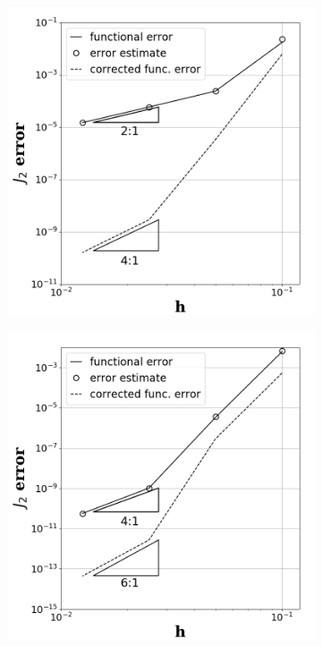 \documentclass[a4paper]{article}
\begin{document}
\begin{figure}[!htbp]
  \centering
  \centering
  \begin{subfigure}{0.45\textwidth}
    \centering
    \includegraphics[width=1.0\linewidth]{figures/subsonic_p1_J2.png}
    \label{fig:subsonic_p1_j2}
  \end{subfigure}
  \begin{subfigure}{0.45\textwidth}
    \centering
    \includegraphics[width=1.0\linewidth]{figures/subsonic_p2_J2.png}

\end{subfigure}
\end{figure}
\end{document}
